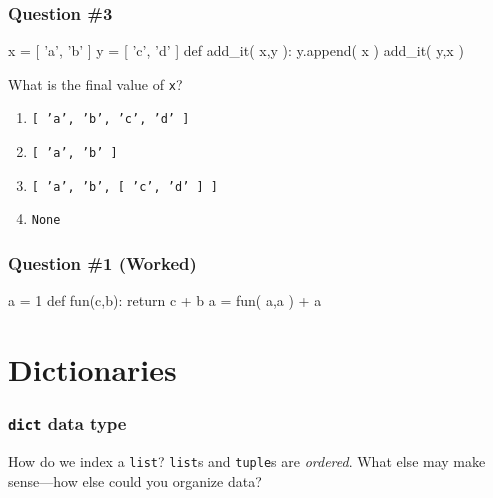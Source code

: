 \documentclass[11pt]{beamer}
\begin{document}
\begin{frame}[fragile]
  \frametitle{Question \#3}  %
  \Enlarge

  \begin{semiverbatim}
x = [ 'a', 'b' ]
y = [ 'c', 'd' ]
def add_it( x,y ):
    y.append( x )
add_it( y,x )
  \end{semiverbatim}
  What is the final value of \texttt{x}?
  \begin{enumerate}[label=\Alph*]
  \item  \texttt{[ 'a', 'b', 'c', 'd' ]}
  \item  \texttt{[ 'a', 'b' ]}
  \item  \texttt{[ 'a', 'b', [ 'c', 'd' ] ]}
  \item  \texttt{None}
  \end{enumerate}
\end{frame}

\begin{frame}[fragile]
  \frametitle{Question \#1 (Worked)}
  \Enlarge

  \begin{semiverbatim}
a = 1
def fun(c,b):
    return c + b
a = fun( a,a ) + a
  \end{semiverbatim}
\end{frame}

\section{Dictionaries}

\begin{frame}[fragile]
  \frametitle{\texttt{dict} data type}
  \Enlarge

  \begin{itemize}
  \myitem  How do we index a \texttt{list}?
  \myitem  \texttt{list}s and \texttt{tuple}s are \emph{ordered}.
  \myitem  What else may make sense---how else could you organize data?
  \end{itemize}
\end{frame}
\end{document}
